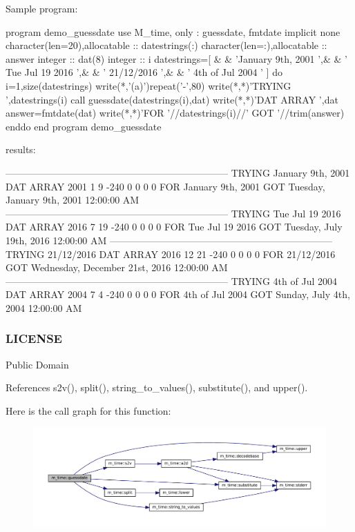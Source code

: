 \begin{DoxyVerb}Sample program:

 program demo_guessdate
 use M_time, only : guessdate, fmtdate
 implicit none
 character(len=20),allocatable :: datestrings(:)
 character(len=:),allocatable  :: answer
 integer                       :: dat(8)
 integer                       :: i
    datestrings=[ &
    & 'January 9th, 2001   ',&
    & ' Tue Jul 19 2016    ',&
    & ' 21/12/2016         ',&
    & ' 4th of Jul 2004    ' ]
    do i=1,size(datestrings)
       write(*,'(a)')repeat('-',80)
       write(*,*)'TRYING ',datestrings(i)
       call guessdate(datestrings(i),dat)
       write(*,*)'DAT ARRAY ',dat
       answer=fmtdate(dat)
       write(*,*)'FOR '//datestrings(i)//' GOT '//trim(answer)
    enddo
 end program demo_guessdate

results:

 ---------------------------------------------------------------------
 TRYING January 9th, 2001
 DAT ARRAY         2001  1  9   -240    0   0   0    0
 FOR January 9th, 2001    GOT Tuesday, January 9th, 2001 12:00:00 AM
 ---------------------------------------------------------------------
 TRYING  Tue Jul 19 2016
 DAT ARRAY         2016  7  19  -240    0   0   0    0
 FOR  Tue Jul 19 2016     GOT Tuesday, July 19th, 2016 12:00:00 AM
 ---------------------------------------------------------------------
 TRYING  21/12/2016
 DAT ARRAY         2016  12 21  -240    0   0   0    0
 FOR  21/12/2016          GOT Wednesday, December 21st, 2016 12:00:00 AM
 ---------------------------------------------------------------------
 TRYING  4th of Jul 2004
 DAT ARRAY         2004  7  4   -240    0   0   0    0
 FOR  4th of Jul 2004     GOT Sunday, July 4th, 2004 12:00:00 AM
\end{DoxyVerb}


\subsubsection*{L\+I\+C\+E\+N\+SE}

Public Domain 

References s2v(), split(), string\+\_\+to\+\_\+values(), substitute(), and upper().

Here is the call graph for this function\+:\nopagebreak
\begin{figure}[H]
\begin{center}
\leavevmode
\includegraphics[width=350pt]{namespacem__time_aa5198c7aa4f3d8411c8ce93046ce3794_cgraph}
\end{center}
\end{figure}
\mbox{\label{namespacem__time_a7ae85160c5039dad604fd05efad2445f}} 
